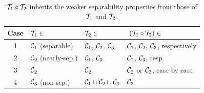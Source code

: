 
\begin{table}
\begin{center}
\begin{tabular}{c|l|l|l}
\hline
Case & ${\mathcal{T}}_1\in$ & ${\mathcal{T}}_2\in$ & $~({\mathcal{T}}_1\circ{\mathcal{T}}_2)\in ~$\\\hline\hline
1 & ${\mathcal{C}}_1$ (separable) & ${\mathcal{C}}_1$, ${\mathcal{C}}_2$, ${\mathcal{C}}_3$ & ${\mathcal{C}}_1$, ${\mathcal{C}}_2$, ${\mathcal{C}}_3$, respectively \\\hline
2 & ${\mathcal{C}}_2$ (nearly-sep.)& ${\mathcal{C}}_1$, ${\mathcal{C}}_3$ & ${\mathcal{C}}_2$, ${\mathcal{C}}_3$, resp. \\\hline
3 & ${\mathcal{C}}_2$ & ${\mathcal{C}}_2$ & ${\mathcal{C}}_2$ or ${\mathcal{C}}_3$, case by case \\\hline
4 & ${\mathcal{C}}_3$ (non-sep.) & ${\mathcal{C}}_1\cup{\mathcal{C}}_2\cup{\mathcal{C}}_3$ & ${\mathcal{C}}_3$ \\\hline
\end{tabular}\end{center}
\caption{${\mathcal{T}}_1\circ{\mathcal{T}}_2$ inherits the weaker separability properties from those of ${\mathcal{T}}_1$ and ${\mathcal{T}}_2$.}\label{table:comp1-op}\end{table}


